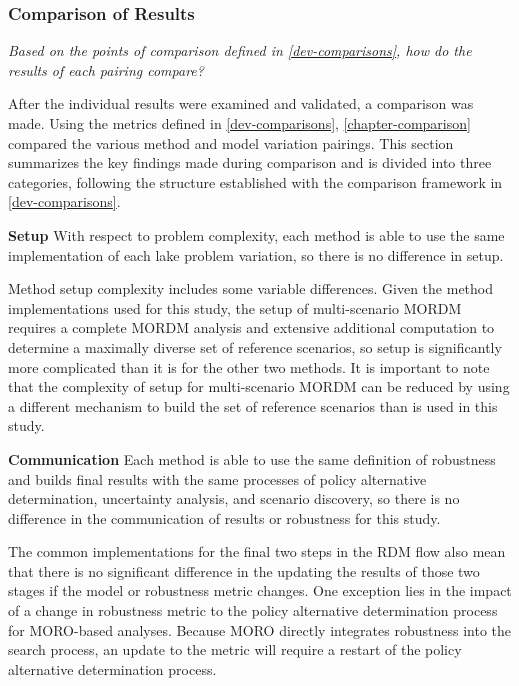         
        \subsubsection{Comparison of Results}
        \textit{Based on the points of comparison defined in \cref{dev-comparisons}, how do the results of each pairing compare?}
        
        After the individual results were examined and validated, a comparison was made. Using the metrics defined in \cref{dev-comparisons}, \cref{chapter-comparison} compared the various method and model variation pairings. This section summarizes the key findings made during comparison and is divided into three categories, following the structure established with the comparison framework in \cref{dev-comparisons}. 
        
        \textbf{Setup} \newline
        With respect to problem complexity, each method is able to use the same implementation of each lake problem variation, so there is no difference in setup. 
        
        Method setup complexity includes some variable differences. Given the method implementations used for this study, the setup of multi-scenario MORDM requires a complete MORDM analysis and extensive additional computation to determine a maximally diverse set of reference scenarios, so setup is significantly more complicated than it is for the other two methods. It is important to note that the complexity of setup for multi-scenario MORDM can be reduced by using a different mechanism to build the set of reference scenarios than is used in this study.
        
        \textbf{Communication} \newline
        Each method is able to use the same definition of robustness and builds final results with the same processes of policy alternative determination, uncertainty analysis, and scenario discovery, so there is no difference in the communication of results or robustness for this study. 
        
        The common implementations for the final two steps in the RDM flow also mean that there is no significant difference in the updating the results of those two stages if the model or robustness metric changes. One exception lies in the impact of a change in robustness metric to the policy alternative determination process for MORO-based analyses. Because MORO directly integrates robustness into the search process, an update to the metric will require a restart of the policy alternative determination process. 
        

